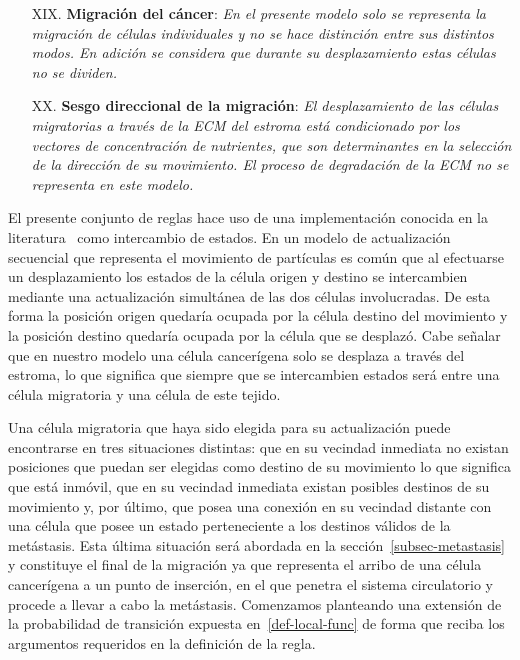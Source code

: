 \begin{itemize}
\item [{XIX.}] \textbf{Migraci\'on del c\'ancer}: \emph{En el presente modelo solo se representa la migraci\'on de c\'elulas individuales y no se hace distinci\'on entre sus distintos modos. En adici\'on se considera que durante su desplazamiento estas c\'elulas no se dividen.} \label{XIX}

\item [{XX.}] \textbf{Sesgo direccional de la migraci\'on}: \emph{El desplazamiento de las c\'elulas migratorias a trav\'es de la ECM del estroma est\'a condicionado por los vectores de concentraci\'on de nutrientes, que son determinantes en la selecci\'on de la direcci\'on de su movimiento. El proceso de degradaci\'on de la ECM no se representa en este modelo.} \label{XX}
\end{itemize}

El presente conjunto de reglas hace uso de una implementaci\'on conocida en la literatura~\cite{book} como intercambio de estados. En un modelo de actualizaci\'on secuencial que representa el movimiento de part\'iculas es com\'un que al efectuarse un desplazamiento los estados de la c\'elula origen y destino se intercambien mediante una actualizaci\'on simult\'anea de las dos c\'elulas involucradas. De esta forma la posici\'on origen quedar\'ia ocupada por la c\'elula destino del movimiento y la posici\'on destino quedar\'ia ocupada por la c\'elula que se desplaz\'o. Cabe se\~nalar que en nuestro modelo una c\'elula cancer\'igena solo se desplaza a trav\'es del estroma, lo que significa que siempre que se intercambien estados ser\'a entre una c\'elula migratoria y una c\'elula de este tejido.

Una c\'elula migratoria que haya sido elegida para su actualizaci\'on puede encontrarse en tres situaciones distintas: que en su vecindad inmediata no existan posiciones que puedan ser elegidas como destino de su movimiento lo que significa que est\'a inm\'ovil, que en su vecindad inmediata existan posibles destinos de su movimiento y, por \'ultimo, que posea una conexi\'on en su vecindad distante con una c\'elula que posee un estado perteneciente a los destinos v\'alidos de la met\'astasis. Esta \'ultima situaci\'on ser\'a abordada en la secci\'on~\ref{subsec-metastasis} y constituye el final de la migraci\'on ya que representa el arribo de una c\'elula cancer\'igena a un punto de inserci\'on, en el que penetra el sistema circulatorio y procede a llevar a cabo la met\'astasis. Comenzamos planteando una extensi\'on de la probabilidad de transici\'on expuesta en~\ref{def-local-func} de forma que reciba los argumentos requeridos en la definici\'on de la regla.

